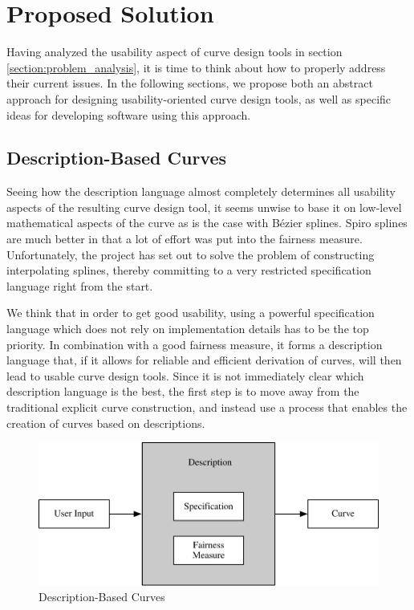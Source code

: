 \documentclass[a4paper]{article}
\begin{document}
	\section{Proposed Solution}
	\label{section:proposed_solution}

		Having analyzed the usability aspect of curve design tools in section \ref{section:problem_analysis}, it is time to think about how to properly address their current issues. In the following sections, we propose both an abstract approach for designing usability-oriented curve design tools, as well as specific ideas for developing software using this approach.
          
		\subsection{Description-Based Curves}
		\label{section:description-based_curves}

			Seeing how the description language almost completely determines all usability aspects of the resulting curve design tool, it seems unwise to base it on low-level mathematical aspects of the curve as is the case with Bézier splines. Spiro splines are much better in that a lot of effort was put into the fairness measure. Unfortunately, the project has set out to solve the problem of constructing interpolating splines, thereby committing to a very restricted specification language right from the start.

			We think that in order to get good usability, using a powerful specification language which does not rely on implementation details has to be the top priority. In combination with a good fairness measure, it forms a description language that, if it allows for reliable and efficient derivation of curves, will then lead to usable curve design tools. Since it is not immediately clear which description language is the best, the first step is to move away from the traditional explicit curve construction, and instead use a process that enables the creation of curves based on descriptions.

			\begin{figure}[htb]
				\centering
				\includegraphics[width=115mm]{content/output/description-based_curves.pdf}
				\caption{Description-Based Curves}
				\label{figure:description-based_curves}
			\end{figure}
\end{document}
